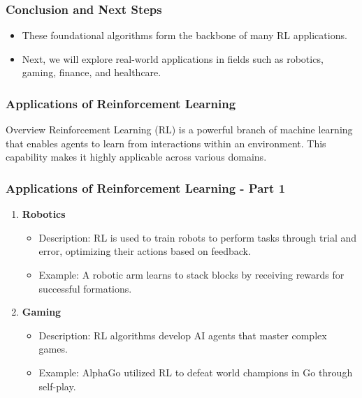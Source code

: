\documentclass{beamer}
\begin{document}
\begin{frame}[fragile]
    \frametitle{Conclusion and Next Steps}
    \begin{itemize}
        \item These foundational algorithms form the backbone of many RL applications.
        \item Next, we will explore real-world applications in fields such as robotics, gaming, finance, and healthcare.
    \end{itemize}
\end{frame}

\begin{frame}
    \frametitle{Applications of Reinforcement Learning}
    \begin{block}{Overview}
        Reinforcement Learning (RL) is a powerful branch of machine learning that enables agents to learn from interactions within an environment. This capability makes it highly applicable across various domains.
    \end{block}
\end{frame}

\begin{frame}
    \frametitle{Applications of Reinforcement Learning - Part 1}
    \begin{enumerate}
        \item \textbf{Robotics}
            \begin{itemize}
                \item Description: RL is used to train robots to perform tasks through trial and error, optimizing their actions based on feedback.
                \item Example: A robotic arm learns to stack blocks by receiving rewards for successful formations.
            \end{itemize}
        
        \item \textbf{Gaming}
            \begin{itemize}
                \item Description: RL algorithms develop AI agents that master complex games.
                \item Example: AlphaGo utilized RL to defeat world champions in Go through self-play.
            \end{itemize}
    \end{enumerate}
\end{frame}
\end{document}

